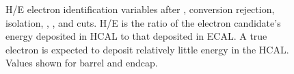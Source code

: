  \begin{figure}[htb]
  \begin{center}
  \end{center}
    \caption[\fixspacing H/E electron identification variables after \Et,
    conversion rejection, isolation, \detain, \dphiin, and \sieie cuts]{
      \fixspacing H/E electron identification variables after \Et,
      conversion rejection, isolation, \detain, \dphiin, and \sieie cuts.  
      H/E is the ratio of the electron candidate's energy deposited 
      in HCAL to that deposited in ECAL.  
      A true electron is expected to deposit relatively little energy in the HCAL.  
      Values shown for  barrel and 
       endcap.
    }
  \label{fig:hOeElecIdVars}
 \end{figure}




